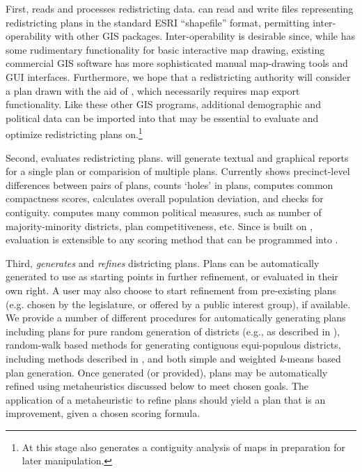 \documentclass[article]{JSSstyle/jss}
\begin{document}
First,  reads and processes redistricting data.  can read and write files representing redistricting plans in the standard ESRI ``shapefile'' format, permitting inter-operability with other GIS packages. Inter-operability is desirable since, while  has some rudimentary functionality for basic interactive map drawing, existing commercial GIS software has more sophisticated manual map-drawing tools and GUI interfaces. Furthermore, we hope that a redistricting authority will consider a plan drawn with the aid of , which necessarily requires map export functionality. Like these other GIS programs, additional demographic and political data can be imported into  that may be essential to evaluate and optimize redistricting plans on.\footnote{At this stage  also generates a contiguity analysis of maps in preparation for later manipulation.}

Second,  evaluates redistricting plans.  will generate textual and graphical reports for a single plan or comparision of multiple plans. Currently   shows precinct-level differences between pairs of plans, counts `holes' in plans, computes common compactness scores, calculates overall population deviation, and checks for contiguity.  computes many common political measures, such as number of majority-minority districts, plan competitiveness, etc. Since  is built on , evaluation is extensible to any scoring method that can be programmed into .

Third,  \emph{generates} and \emph{refines} districting plans. Plans can be automatically generated to use as starting points in further refinement, or evaluated in their own right. A user may also choose to start refinement from pre-existing plans (e.g. chosen by the legislature, or offered by a public interest group), if available. We provide a number of different procedures for automatically generating plans including plans for pure random generation of districts (e.g., as described in \citet{Grofman82}), random-walk based methods for generating contiguous equi-populous districts, including methods described in \citet{CirDarOro00}, and both simple and weighted \emph{k}-means based plan generation. Once generated (or provided), plans may be automatically refined using metaheuristics discussed below to meet chosen goals. The application of a metaheuristic to refine plans should yield a plan that is an improvement, given a chosen scoring formula.  
\end{document}
